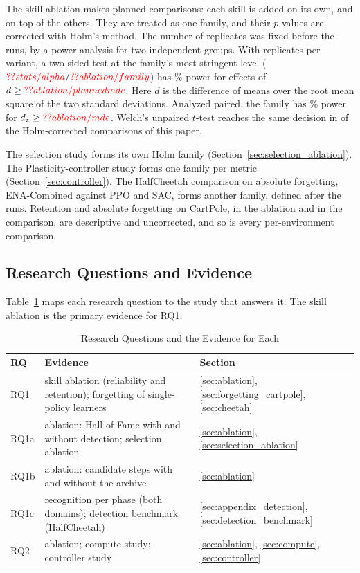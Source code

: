 The skill ablation makes  planned comparisons: each skill is added on its own, and on top of the others. They are treated as one family, and their $p$-values are corrected with Holm's method. The number of replicates was fixed before the runs, by a power analysis for two independent groups. With  replicates per variant, a two-sided test at the family's most stringent level ($\Res{stats/alpha}/\Res{ablation/family}$) has \% power for effects of $d \ge \Res{ablation/plannedmde}$. Here $d$ is the difference of means over the root mean square of the two standard deviations. Analyzed paired, the family has \% power for $d_z \ge \Res{ablation/mde}$. Welch's unpaired $t$-test reaches the same decision in  of the  Holm-corrected comparisons of this paper.

The selection study forms its own Holm family (Section~\ref{sec:selection_ablation}). The Plasticity-controller study forms one family per metric (Section~\ref{sec:controller}). The HalfCheetah comparison on absolute forgetting, ENA-Combined against PPO and SAC, forms another family, defined after the runs. Retention and absolute forgetting on CartPole, in the ablation and in the comparison, are descriptive and uncorrected, and so is every per-environment comparison.

\subsection{Research Questions and Evidence}
Table~\ref{tab:rq_map} maps each research question to the study that answers it. The skill ablation is the primary evidence for RQ1.

\begin{table}[htbp]
\caption{Research Questions and the Evidence for Each}
\begin{center}
\footnotesize
\setlength{\tabcolsep}{3pt}
\begin{tabular}{|l|p{}|l|}
\hline
\textbf{RQ} & \textbf{Evidence} & \textbf{Section} \\
\hline
RQ1 & skill ablation (reliability and retention); forgetting of single-policy learners & \ref{sec:ablation}, \ref{sec:forgetting_cartpole}, \ref{sec:cheetah} \\
RQ1a & ablation: Hall of Fame with and without detection; selection ablation & \ref{sec:ablation}, \ref{sec:selection_ablation} \\
RQ1b & ablation: candidate steps with and without the archive & \ref{sec:ablation} \\
RQ1c & recognition per phase (both domains); detection benchmark (HalfCheetah) & \ref{sec:appendix_detection}, \ref{sec:detection_benchmark} \\
RQ2 & ablation; compute study; controller study & \ref{sec:ablation}, \ref{sec:compute}, \ref{sec:controller} \\
\hline
\end{tabular}
\label{tab:rq_map}
\end{center}
\end{table}
